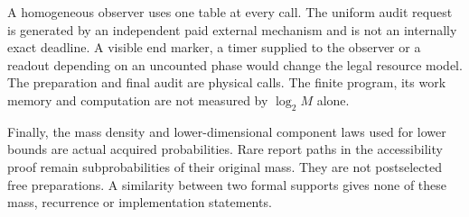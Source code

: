 A homogeneous observer uses one table at every call. The uniform audit request is generated by an independent paid external mechanism and is not an internally exact deadline. A visible end marker, a timer supplied to the observer or a readout depending on an uncounted phase would change the legal resource model. The preparation and final audit are physical calls. The finite program, its work memory and computation are not measured by $\log_2 M$ alone.

Finally, the mass density and lower-dimensional component laws used for lower bounds are actual acquired probabilities. Rare report paths in the accessibility proof remain subprobabilities of their original mass. They are not postselected free preparations. A similarity between two formal supports gives none of these mass, recurrence or implementation statements.
